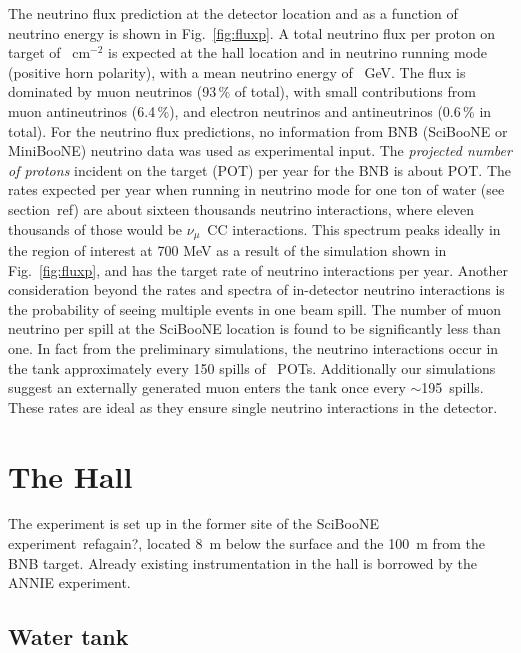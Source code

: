 The neutrino flux prediction at the detector location and as a function %
of neutrino energy is shown in Fig.~\ref{fig:fluxp}.
A total neutrino flux per proton on target of ~cm$^{-2}$ is expected at the %
hall location and in neutrino running mode (positive horn polarity), with %
a mean neutrino energy of ~GeV. 
The flux is dominated by muon neutrinos (93\,\% of total), with small contributions from %
muon antineutrinos (6.4\,\%), and electron neutrinos and antineutrinos (0.6\,\% in total). 
For the neutrino flux predictions, no information from BNB %
(SciBooNE or MiniBooNE) neutrino data was used as experimental input.
The \emph{projected number of protons} incident on the target (POT) per year for the BNB %
is about  POT.
The rates expected per year when running in neutrino mode for one ton of water %
(see section~ref) are about sixteen thousands neutrino interactions, %
where eleven thousands of those would be $\nu_\mu$~CC interactions. 
This spectrum peaks ideally in the region of interest at 700 MeV as a result of the simulation %
shown in Fig.~\ref{fig:fluxp}, and has the target rate of neutrino interactions per year.
Another consideration beyond the rates and spectra of in-detector neutrino interactions %
is the probability of seeing multiple events in one beam spill. 
The number of muon neutrino per spill at the SciBooNE location is found to be significantly %
less than one.
In fact from the preliminary simulations, the neutrino interactions occur%
in the tank approximately every 150 spills of ~POTs. 
Additionally our simulations suggest an externally generated muon enters the tank once %
every $\sim$195~spills. 
These rates are ideal as they ensure single neutrino interactions in the detector.

\section{The Hall}

The experiment is set up in the former site of the SciBooNE experiment~refagain?, %
located 8~m below the surface and the 100~m from the BNB target.
Already existing instrumentation in the hall is borrowed by the ANNIE experiment.

\subsection{Water tank}

